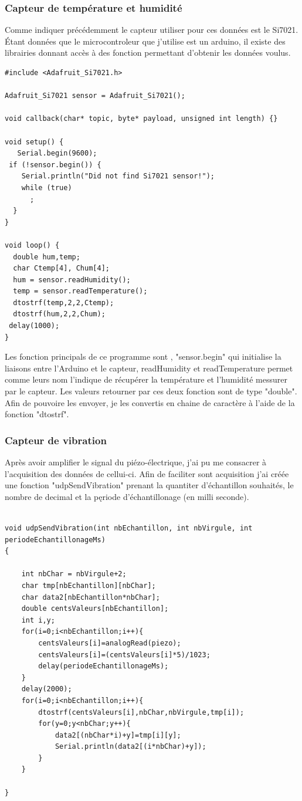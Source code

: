 \documentclass[11pt,french,a4paper]{article}
\begin{document}
\subsubsection{Capteur de température et humidité}
Comme indiquer précédemment le capteur utiliser pour ces données est le Si7021. Étant données que le microcontroleur que j'utilise est un arduino, il existe des librairies donnant accès à des fonction permettant d'obtenir les données voulus.
\begin{scriptsize}
	\begin{lstlisting}
#include <Adafruit_Si7021.h>

Adafruit_Si7021 sensor = Adafruit_Si7021();

void callback(char* topic, byte* payload, unsigned int length) {}

void setup() {
   Serial.begin(9600);
 if (!sensor.begin()) {
    Serial.println("Did not find Si7021 sensor!");
    while (true)
      ;
  }
}

void loop() {
  double hum,temp;
  char Ctemp[4], Chum[4];
  hum = sensor.readHumidity();
  temp = sensor.readTemperature();
  dtostrf(temp,2,2,Ctemp);
  dtostrf(hum,2,2,Chum);
 delay(1000);
}	
	\end{lstlisting}
\end{scriptsize}

Les fonction principals de ce programme sont , "sensor.begin" qui initialise la liaisons entre l'Arduino et le capteur, readHumidity et readTemperature permet comme leurs nom l'indique de récupérer la température et l'humidité messurer par le capteur. Les valeurs retourner par ces deux fonction sont de type "double". Afin de pouvoire les envoyer, je les convertis en chaine de caractère à l'aide de la fonction "dtostrf".

\subsubsection{Capteur de vibration}
Après avoir amplifier le signal du piézo-électrique, j'ai pu me consacrer à l'acquisition des données de cellui-ci. Afin de faciliter sont acquisition j'ai créée une fonction "udpSendVibration" prenant la quantiter d'échantillon souhaités, le nombre de decimal et la pęriode d'échantillonage (en milli seconde).
\begin{scriptsize}
\begin{lstlisting}

void udpSendVibration(int nbEchantillon, int nbVirgule, int periodeEchantillonageMs)
{

	int nbChar = nbVirgule+2;
	char tmp[nbEchantillon][nbChar];
	char data2[nbEchantillon*nbChar];
	double centsValeurs[nbEchantillon];
	int i,y;
	for(i=0;i<nbEchantillon;i++){
		centsValeurs[i]=analogRead(piezo);
		centsValeurs[i]=(centsValeurs[i]*5)/1023;
		delay(periodeEchantillonageMs);
	}
	delay(2000);
	for(i=0;i<nbEchantillon;i++){
		dtostrf(centsValeurs[i],nbChar,nbVirgule,tmp[i]);
		for(y=0;y<nbChar;y++){
			data2[(nbChar*i)+y]=tmp[i][y];
			Serial.println(data2[(i*nbChar)+y]);	
		}	
	}

}
\end{lstlisting}
\end{scriptsize} 
\end{document}
